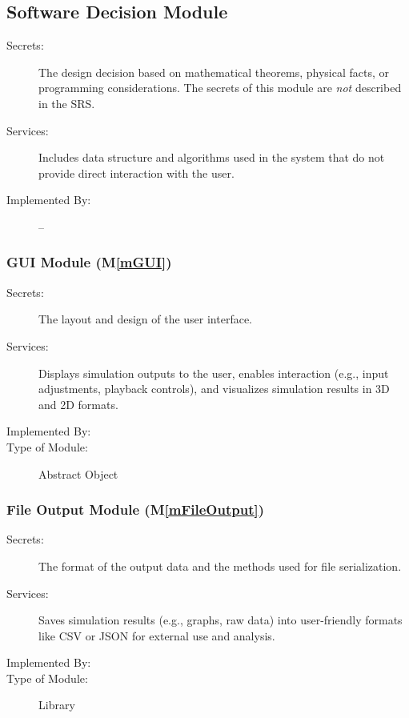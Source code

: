 \documentclass[12pt, titlepage]{article}
\newcommand{\mref}[1]{M\ref{#1}}
\begin{document}
\subsection{Software Decision Module}

\begin{description}
\item[Secrets:] The design decision based on mathematical theorems, physical
  facts, or programming considerations. The secrets of this module are
  \emph{not} described in the SRS.
\item[Services:] Includes data structure and algorithms used in the system that
  do not provide direct interaction with the user. 
\item[Implemented By:] --
\end{description}

\subsubsection{GUI Module (\mref{mGUI})}

\begin{description}
\item[Secrets:] The layout and design of the user interface.
\item[Services:] Displays simulation outputs to the user, enables interaction (e.g., input adjustments, playback controls), and visualizes simulation results in 3D and 2D formats.
\item[Implemented By:] \progname{}
\item[Type of Module:] Abstract Object
\end{description}

\subsubsection{File Output Module (\mref{mFileOutput})}

\begin{description}
\item[Secrets:] The format of the output data and the methods used for file serialization.
\item[Services:] Saves simulation results (e.g., graphs, raw data) into user-friendly formats like CSV or JSON for external use and analysis.
\item[Implemented By:] \progname{}
\item[Type of Module:] Library
\end{description}
\end{document}
